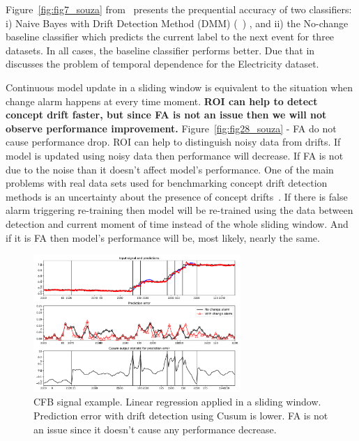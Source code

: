 \documentclass[12 pt]{article}
\begin{document}
  Figure~\ref{fig:fig7_souza} from~\cite{SouzaRMB20} presents the prequential accuracy of two classifiers: i) Naive Bayes with Drift Detection Method (DMM) (~\cite{gama2004learning}) , and ii) the No-change baseline classifier which predicts the current label to the next event for three datasets. In all cases, the baseline classifier performs better.
  Due that in~\cite{zliobaite2013good} discusses the problem of temporal dependence for the Electricity dataset.

  Continuous model update in a sliding window is equivalent to the situation when change alarm happens at every time moment.
  \textbf{ROI can help to detect concept drift faster, but since FA is not an issue then we will not observe performance improvement.}
  Figure~\ref{fig:fig28_souza} - FA do not cause performance drop.
  ROI can help to distinguish noisy data from drifts. If model is updated using noisy data then performance will decrease.
  If FA is not due to the noise than it doesn't affect model's performance. 
  One of the main problems with real data sets used for benchmarking concept drift detection methods is an uncertainty about the presence of concept drifts~\cite{SouzaRMB20}.
  If there is false alarm triggering re-training then model will be re-trained using the data between detection and current moment of time instead of the whole sliding window.
  And if it is FA then model's performance will be, most likely, nearly the same.

  \begin{figure}[!htb]
    \centering
    \includegraphics[width=0.7\textwidth]{images/proof_of_concept_linreg_cfb_sig}
    \caption{CFB signal example.  Linear regression applied in a sliding window.  Prediction error with drift detection using Cusum is lower.  FA is not an issue since it doesn't cause any performance decrease.}\label{fig:cfb_sig_linreg_proof_of_concept}
  \end{figure}
\end{document}
